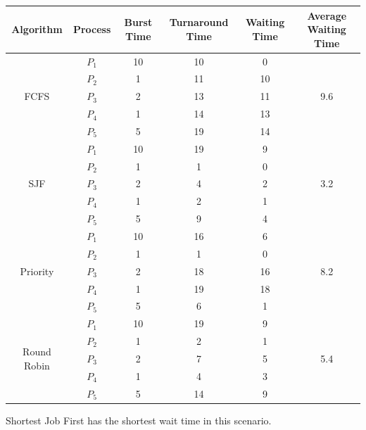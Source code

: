 \documentclass[letterpaper, 10pt,DIV=13]{scrartcl}
\numberwithin{equation}{section} %
\numberwithin{figure}{section} %
\numberwithin{table}{section} %
\begin{document}
\begin{center}
\begin{tabular}{|c|c|c|c|c|c|}
\hline
Algorithm & Process & Burst Time & Turnaround Time & Waiting Time & Average Waiting Time \\
\hline
\multirow{5}{*}{FCFS} & $P_1$ & 10 & 10 & 0 & \multirow{5}{*}{9.6} \\
& $P_2$ & 1 & 11 & 10 & \\
& $P_3$ & 2 & 13 & 11 & \\
& $P_4$ & 1 & 14 & 13 & \\
& $P_5$ & 5 & 19 & 14 & \\
\hline
\multirow{5}{*}{SJF} & $P_1$ & 10 & 19 & 9 & \multirow{5}{*}{3.2} \\
& $P_2$ & 1 & 1 & 0 & \\
& $P_3$ & 2 & 4 & 2 & \\
& $P_4$ & 1 & 2 & 1 & \\
& $P_5$ & 5 & 9 & 4 & \\
\hline
\multirow{5}{*}{Priority} & $P_1$ & 10 & 16 & 6 & \multirow{5}{*}{8.2} \\
& $P_2$ & 1 & 1 & 0 & \\
& $P_3$ & 2 & 18 & 16 & \\
& $P_4$ & 1 & 19 & 18 & \\
& $P_5$ & 5 & 6 & 1 & \\
\hline
\multirow{5}{*}{Round Robin} & $P_1$ & 10 & 19 & 9 & \multirow{5}{*}{5.4} \\
& $P_2$ & 1 & 2 & 1 & \\
& $P_3$ & 2 & 7 & 5 & \\
& $P_4$ & 1 & 4 & 3 & \\
& $P_5$ & 5 & 14 & 9 & \\
\hline
\end{tabular}
\end{center}
Shortest Job First has the shortest wait time in this scenario.
\end{document}
